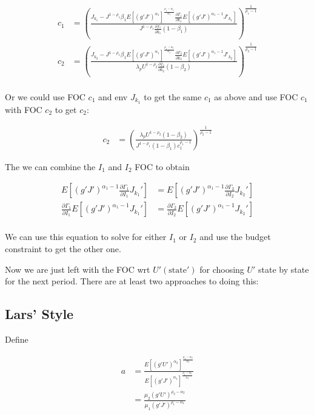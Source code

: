\documentclass[10pt]{article}
\newcommand{\fracpd}[2]{
  \ensuremath{\frac{\partial #1}{\partial #2}}
}
\begin{document}
\begin{align} \label{eq:solve_c}
  c_1 &= \left( \frac{J_{k_1} - J^{1-\rho_1} \beta_1 E\left[(g'J')^{\alpha_1} \right]^{\frac{\rho_1 - \alpha_1}{\alpha_1}} \fracpd{\Gamma_1}{k_1} E \left[ (g'J')^{\alpha_1 - 1} J'_{k_1} \right]}{J^{1-\rho_1} \fracpd{f_1}{k_1} (1 - \beta_1)} \right)^{\frac{1}{\rho_1 - 1}} \\
   c_2 &= \left( \frac{J_{k_2} - J^{1-\rho_1} \beta_1 E\left[(g'J')^{\alpha_1} \right]^{\frac{\rho_1 - \alpha_1}{\alpha_1}} \fracpd{\Gamma_2}{k_2} E \left[ (g'J')^{\alpha_1 - 1} J'_{k_2} \right]}{\lambda_p  U^{1-\rho_2} \fracpd{f_2}{k_2} (1 - \beta_2)} \right)^{\frac{1}{\rho_2 - 1}} \\
\end{align}


Or we could use FOC $c_1$ and env $J_{k_1}$ to get the same $c_1$ as above and
use FOC $c_1$ with FOC $c_2$ to get $c_2$:

\begin{align*}
  c_2 &= \left( \frac{\lambda_p U^{1-\rho_2}(1 - \beta_2)}{J^{1-\rho_1} (1 - \beta_1)c_1^{\rho_1 - 1}} \right)^{\frac{1}{\rho_2-1}}
\end{align*}

The we can combine the $I_1$ and $I_2$ FOC to obtain

\begin{align} \label{eq:solve_I}
  E \left[ (g'J')^{\alpha_1 - 1} \fracpd{\Gamma_1}{I_1} J_{k_1}' \right] &= E \left[ (g'J')^{\alpha_1 - 1} \fracpd{\Gamma_2}{I_2} J_{k_2}' \right] \\
  \fracpd{\Gamma_1}{I_1} E \left[ (g'J')^{\alpha_1 - 1} J_{k_1}' \right] &= \fracpd{\Gamma_2}{I_2} E \left[ (g'J')^{\alpha_1 - 1} J_{k_2}' \right] \\
\end{align}

We can use this equation to solve for either $I_1$ or $I_2$ and use the budget constraint to get the other one.

Now we are just left with the FOC wrt $U'(\text{state}')$ for choosing $U'$ state by state for the next period. There are at least two approaches to doing this:

  \subsection{Lars' Style} \label{sub:Lars_Style}

    Define

    \begin{align*}
      a &= \frac{E \left[ (g'U')^{\alpha_2} \right]^{\frac{\rho_2 - \alpha_2}{\alpha_2}}}{E \left[ (g'J')^{\alpha_1} \right]^{\frac{\rho_1 - \alpha_1}{\alpha_1}}} \\
      &= \frac{\mu_2(g' U')^{\rho_2 - \alpha_2}}{\mu_1(g' J')^{\rho_1 - \alpha_1}} \\
    \end{align*}
\end{document}
